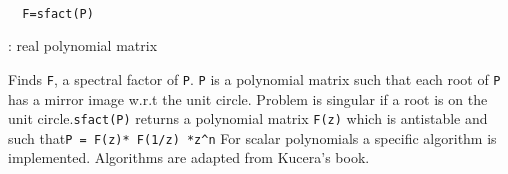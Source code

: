 

\begin{mandesc}
   \\ %
\end{mandesc}
\begin{calling_sequence}
\begin{verbatim}
  F=sfact(P)  
\end{verbatim}
\end{calling_sequence}
\begin{parameters}
  \begin{varlist}
    : real polynomial matrix
  \end{varlist}
\end{parameters}
\begin{mandescription}
  Finds \verb!F!, a spectral factor of
  \verb!P!. \verb!P! is a polynomial matrix such that
  each root of \verb!P! has a mirror image w.r.t the unit
  circle. Problem is singular if a root is on the unit circle.\verb!sfact(P)! returns a polynomial matrix
  \verb!F(z)! which is antistable and such that\verb!P = F(z)* F(1/z) *z^n!
  For scalar polynomials a specific algorithm is implemented.
  Algorithms are adapted from Kucera's book.
\end{mandescription}
\begin{examples}
\end{examples}
\begin{manseealso}
     
\end{manseealso}
